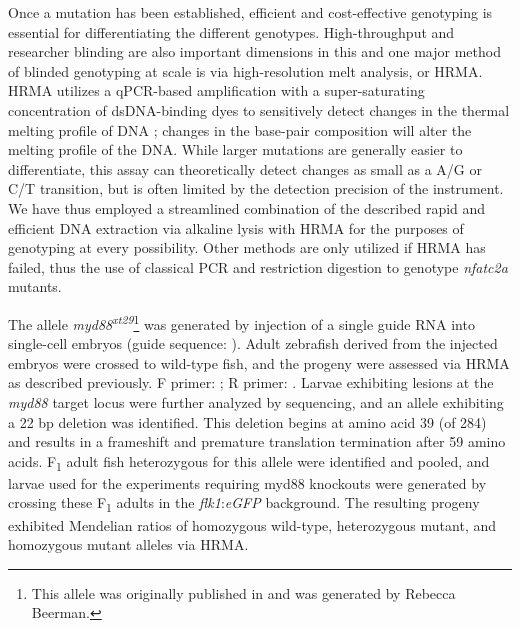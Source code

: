 Once a mutation has been established, efficient and cost\hyp{}effective genotyping is essential for differentiating the different genotypes. High\hyp{}throughput and researcher blinding are also important dimensions in this and one major method of blinded genotyping at scale is via high\hyp{}resolution melt analysis, or HRMA. HRMA utilizes a qPCR\hyp{}based amplification with a super\hyp{}saturating concentration of dsDNA\hyp{}binding dyes to sensitively detect changes in the thermal melting profile of DNA \citep{Reed2007, Thomas2014}; changes in the base\hyp{}pair composition will alter the melting profile of the DNA. While larger mutations are generally easier to differentiate, this assay can theoretically detect changes as small as a A/G or C/T transition, but is often limited by the detection precision of the instrument. We have thus employed a streamlined combination of the described rapid and efficient DNA extraction via alkaline lysis \citep{Meeker2007} with HRMA for the purposes of genotyping at every possibility. Other methods are only utilized if HRMA has failed, thus the use of classical PCR and restriction digestion to genotype \textit{nfatc2a} mutants.

The allele \textit{myd88\textsuperscript{xt29}}\footnote{This allele was originally published in  and was generated by Rebecca Beerman.} was generated by injection of a single guide RNA into single-cell embryos (guide sequence: ). Adult zebrafish derived from the injected embryos were crossed to wild-type fish, and the progeny were assessed via HRMA as described previously. F primer: ; R primer: . Larvae exhibiting lesions at the \textit{myd88} target locus were further analyzed by sequencing, and an allele exhibiting a 22 bp deletion was identified. This deletion begins at amino acid 39 (of 284) and results in a frameshift and premature translation termination after 59 amino acids. F\textsubscript{1} adult fish heterozygous for this allele were identified and pooled, and larvae used for the experiments requiring myd88 knockouts were generated by crossing these F\textsubscript{1} adults in the \textit{flk1}:\textit{eGFP} background. The resulting progeny exhibited Mendelian ratios of homozygous wild-type, heterozygous mutant, and homozygous mutant alleles via HRMA.

